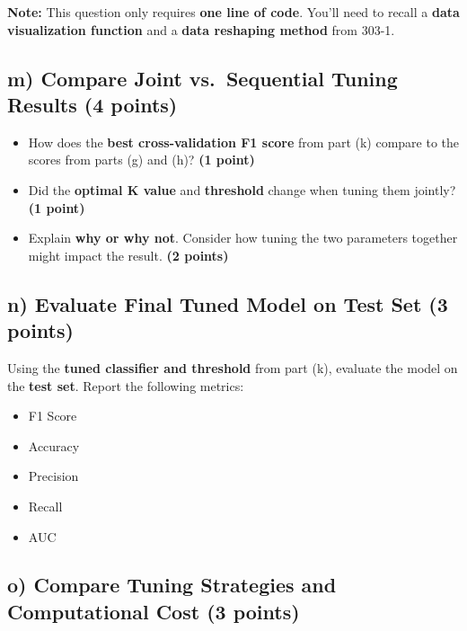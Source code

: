 \documentclass[
  letterpaper,
  DIV=11,
  numbers=noendperiod]{scrreprt}
\providecommand{\tightlist}{%
  \setlength{\itemsep}{0pt}\setlength{\parskip}{0pt}}\usepackage{longtable,booktabs,array}
\begin{document}
\textbf{Note:} This question only requires \textbf{one line of code}.
You'll need to recall a \textbf{data visualization function} and a
\textbf{data reshaping method} from 303-1.

\subsection{\texorpdfstring{m) Compare Joint vs.~Sequential Tuning
Results \textbf{(4
points)}}{m) Compare Joint vs.~Sequential Tuning Results (4 points)}}\label{m-compare-joint-vs.-sequential-tuning-results-4-points}

\begin{itemize}
\tightlist
\item
  How does the \textbf{best cross-validation F1 score} from part (k)
  compare to the scores from parts (g) and (h)? \textbf{(1 point)}
\item
  Did the \textbf{optimal K value} and \textbf{threshold} change when
  tuning them jointly? \textbf{(1 point)}
\item
  Explain \textbf{why or why not}. Consider how tuning the two
  parameters together might impact the result. \textbf{(2 points)}
\end{itemize}

\subsection{\texorpdfstring{n) Evaluate Final Tuned Model on Test Set
\textbf{(3
points)}}{n) Evaluate Final Tuned Model on Test Set (3 points)}}\label{n-evaluate-final-tuned-model-on-test-set-3-points}

Using the \textbf{tuned classifier and threshold} from part (k),
evaluate the model on the \textbf{test set}. Report the following
metrics:

\begin{itemize}
\tightlist
\item
  F1 Score\\
\item
  Accuracy\\
\item
  Precision\\
\item
  Recall\\
\item
  AUC
\end{itemize}

\subsection{\texorpdfstring{o) Compare Tuning Strategies and
Computational Cost \textbf{(3
points)}}{o) Compare Tuning Strategies and Computational Cost (3 points)}}\label{o-compare-tuning-strategies-and-computational-cost-3-points}
\end{document}
